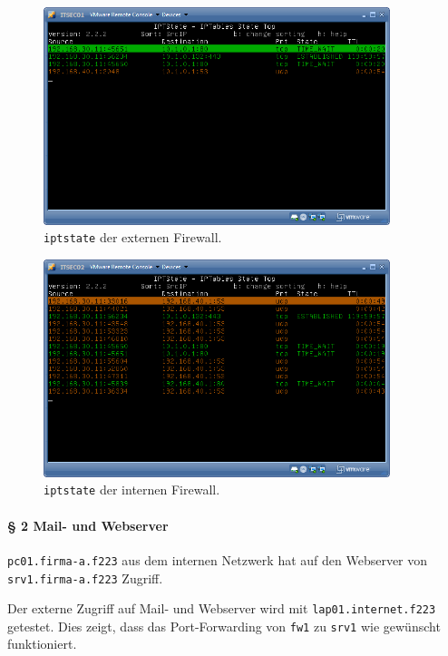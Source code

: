 \begin{figure}[h!]
  \centering
    \includegraphics[width=0.9\textwidth]{figures/iptstate-extern.png}
  \caption{{\tt iptstate} der externen Firewall.}
  \label{fig.iptstate-extern}
\end{figure}

\begin{figure}[h!]
  \centering
    \includegraphics[width=0.9\textwidth]{figures/iptstate-intern.png}
  \caption{{\tt iptstate} der internen Firewall.}
  \label{fig.iptstate-intern}
\end{figure}


\paragraph{§ 2 Mail- und Webserver}

{\tt pc01.firma-a.f223} aus dem internen Netzwerk hat auf
den Webserver von {\tt srv1.firma-a.f223} Zugriff.

Der externe Zugriff auf Mail- und Webserver wird mit {\tt lap01.internet.f223}
getestet.
Dies zeigt, dass das Port-Forwarding von {\tt fw1} zu {\tt srv1}
wie gewünscht funktioniert.

